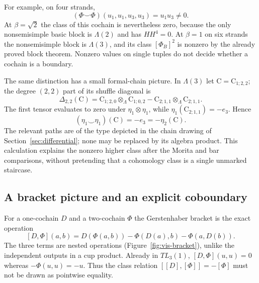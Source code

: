 \documentclass[a4paper,11pt,oneside,reqno]{amsart}
\theoremstyle{definition}
\numberwithin{equation}{section}
\begin{document}
For example, on four strands,
\[
 (\Phi\smile\Phi)(u_1,u_1,u_3,u_3)=u_1u_3\ne0.
\]
At $\beta=\sqrt2$ the class of this cochain is nevertheless zero,
because the only nonsemisimple basic block is $\Lambda(2)$ and has
$HH^4=0$. At $\beta=1$ on six strands the nonsemisimple block is
$\Lambda(3)$, and its class $[\Phi_B]^2$ is nonzero by the already
proved block theorem. Nonzero values on single tuples do not decide
whether a cochain is a boundary.

The same distinction has a small formal-chain picture. In $\Lambda(3)$
let $\mathrm C=\mathrm C_{1;2,2}$; the degree $(2,2)$ part of its
shuffle diagonal is
\[
 \Delta_{2,2}(\mathrm C)=
 \mathrm C_{1;2,0}\otimes_\Lambda\mathrm C_{1;0,2}
 -\mathrm C_{2;1,1}\otimes_\Lambda\mathrm C_{2;1,1}.
\]
The first tensor evaluates to zero under $\eta_1\otimes\eta_1$, while
$\eta_1(\mathrm C_{2;1,1})=-e_3$. Hence
\[
 (\eta_1\smile\eta_1)(\mathrm C)=-e_3=-\eta_2(\mathrm C).
\]
The relevant paths are of the type depicted in the chain drawing of
Section~\ref{sec:differential}; none may be replaced by its algebra product. This calculation explains the
nonzero higher class after the Morita and bar comparisons, without
pretending that a cohomology class is a single unmarked staircase.

\subsection{A bracket picture and an explicit coboundary}
For a one-cochain $D$ and a two-cochain $\Phi$ the Gerstenhaber bracket
is the exact operation
\begin{equation}\label{vis:bracket}
 [D,\Phi](a,b)=D(\Phi(a,b))-\Phi(D(a),b)-\Phi(a,D(b)).
\end{equation}
The three terms are nested operations (Figure~\ref{fig:vis-bracket}),
unlike the independent outputs in a cup product. Already in $TL_3(1)$,
$[D,\Phi](u,u)=0$ whereas $-\Phi(u,u)=-u$. Thus the class relation
$[[D],[\Phi]]=-[\Phi]$ must not be drawn as pointwise equality.
\end{document}
